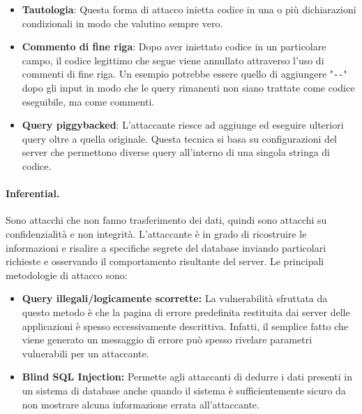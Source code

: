 \begin{itemize}
      \item \textbf{Tautologia}: Questa forma di attacco inietta codice in una o
            più dichiarazioni condizionali in modo che valutino sempre vero.
      \item \textbf{Commento di fine riga}: Dopo aver iniettato codice in un
            particolare campo, il codice legittimo che segue viene annullato
            attraverso l'uso di commenti di fine riga. Un esempio potrebbe
            essere quello di aggiungere "\verb|--|" dopo gli input in modo che
            le query rimanenti non siano trattate come codice eseguibile, ma come
            commenti.
      \item \textbf{Query piggybacked}: L'attaccante riesce ad aggiunge ed
            eseguire ulteriori query oltre a quella originale. Questa
            tecnica si basa su configurazioni del server che permettono diverse
            query all'interno di una singola stringa di codice.
\end{itemize}

\paragraph{Inferential.}
Sono attacchi che non fanno trasferimento dei dati, quindi sono attacchi su
confidenzialità e non integrità. L'attaccante è in
grado di ricostruire le informazioni e risalire a specifiche segrete del database
inviando particolari richieste
e osservando il comportamento risultante del server.
Le principali metodologie di attacco sono:
\begin{itemize}
      \item \textbf{Query illegali/logicamente scorrette:} La vulnerabilità
            sfruttata da questo metodo è che la pagina di errore
            predefinita restituita dai server delle applicazioni è
            spesso eccessivamente descrittiva. Infatti, il semplice
            fatto che viene generato un messaggio di errore può
            spesso rivelare parametri vulnerabili per un
            attaccante.

      \item \textbf{Blind SQL Injection:} Permette agli attaccanti di dedurre i
            dati presenti in un sistema di database anche quando il sistema è
            sufficientemente sicuro da non mostrare alcuna informazione errata
            all'attaccante.
\end{itemize}


